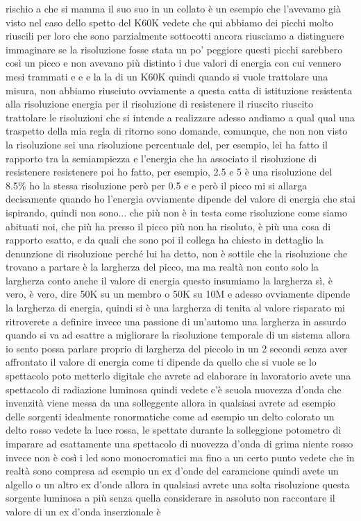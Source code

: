 rischio a che si mamma il suo suo in un collato è un esempio che l'avevamo già visto nel caso dello spetto del K60K vedete che qui abbiamo dei picchi molto riuscili per loro che sono parzialmente sottocotti ancora riusciamo a distinguere immaginare se la risoluzione fosse stata un po' peggiore questi picchi sarebbero così un picco e non avevano più distinto i due valori di energia con cui vennero mesi trammati e e e la la di un K60K quindi quando si vuole trattolare una misura, non abbiamo riusciuto ovviamente a questa catta di istituzione resistenta alla risoluzione energia per il risoluzione di resistenere il riuscito riuscito trattolare le risoluzioni che si intende a realizzare adesso andiamo a qual qual una traspetto della mia regla di ritorno sono domande, comunque, che non non visto la risoluzione sei una risoluzione percentuale del, per esempio, lei ha fatto il rapporto tra la semiampiezza e l'energia che ha associato il risoluzione di resistenere resistenere poi ho fatto, per esempio, 2.5 e 5 è una risoluzione del 8.5\% ho la stessa risoluzione però per 0.5 e e però il picco mi si allarga decisamente quando ho l'energia ovviamente dipende del valore di energia che stai ispirando, quindi non sono... che più non è in testa come risoluzione come siamo abituati noi, che più ha presso il picco più non ha risoluto, è più una cosa di rapporto esatto, e da quali che sono poi il collega ha chiesto in dettaglio la denunzione di risoluzione perché lui ha detto, non è sottile che la risoluzione che trovano a partare è la largherza del picco, ma ma realtà non conto solo la largherza conto anche il valore di energia questo insumiamo la largherza sì, è vero, è vero, dire 50K su un membro o 50K su 10M e adesso ovviamente dipende la largherza di energia, quindi si è una largherza di tenita al valore risparato mi ritroverete a definire invece una passione di un'automo una largherza in assurdo quando si va ad esattre a migliorare la risoluzione temporale di un sistema allora io sento possa parlare proprio di largherza del piccolo in un 2 secondi senza aver affrontato il valore di energia come ti dipende da quello che si vuole se lo spettacolo poto metterlo digitale che avrete ad elaborare in lavoratorio avete una spettacolo di radiazione luminosa quindi vedete c'è scuola nuovezza d'onda che invenzità viene messa da una solleggente allora in qualsiasi avrete ad esempio delle sorgenti idealmente ronormatiche come ad esempio un delto colorato un delto rosso vedete la luce rossa, le spettate durante la solleggione potometro di imparare ad esattamente una spettacolo di nuovezza d'onda di grima niente rosso invece non è così i led sono monocromatici ma fino a un certo punto vedete che in realtà sono compresa ad esempio un ex d'onde del caramcione quindi avete un algello o un altro ex d'onde allora in qualsiasi avrete una solta risoluzione questa sorgente luminosa a più senza quella considerare in assoluto non raccontare il valore di un ex d'onda inserzionale è 

